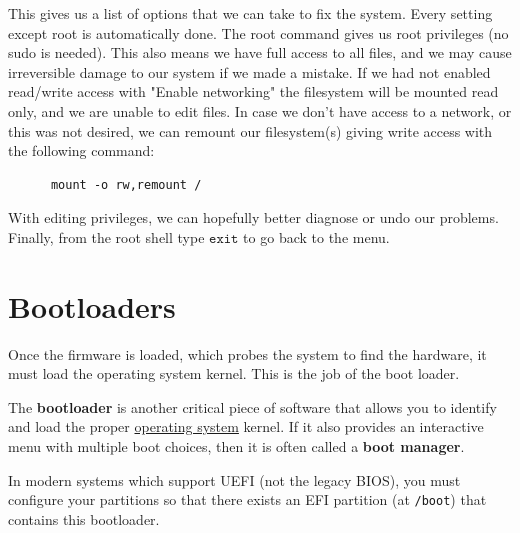 \documentclass{article}
\newcounter{definition}[section]
\begin{document}
    This gives us a list of options that we can take to fix the system. Every setting except root is automatically done. The root command gives us root privileges (no sudo is needed). This also means we have full access to all files, and we may cause irreversible damage to our system if we made a mistake. If we had not enabled read/write access with "Enable networking" the filesystem will be mounted read only, and we are unable to edit files. In case we don't have access to a network, or this was not desired, we can remount our filesystem(s) giving write access with the following command:  
    \begin{lstlisting}
      mount -o rw,remount /
    \end{lstlisting}
    With editing privileges, we can hopefully better diagnose or undo our problems. Finally, from the root shell type $\texttt{exit}$ to go back to the menu. 

\section{Bootloaders} 

  Once the firmware is loaded, which probes the system to find the hardware, it must load the operating system kernel. This is the job of the boot loader.

  \begin{definition}
    \label{def:boot-loader-boot-manager}
    The \textbf{bootloader} is another critical piece of software that allows you to identify and load the proper \hyperref[def:operating-system]{operating system} kernel. If it also provides an interactive menu with multiple boot choices, then it is often called a \textbf{boot manager}. 
  \end{definition}

  In modern systems which support UEFI (not the legacy BIOS), you must configure your partitions so that there exists an EFI partition (at \texttt{/boot}) that contains this bootloader. 
\end{document}
